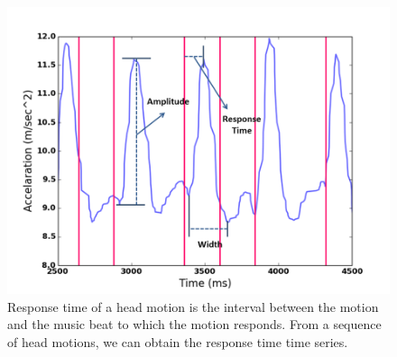 \begin{figure}[t]
\includegraphics[width=.75\columnwidth]{figure/waveform_resp.png}
\centering
\caption{\label{fig:waveform}Response time of a head motion is the interval between the motion and the music beat to which the motion responds. From a sequence of head motions, we can obtain the response time time series.}
\end{figure}


